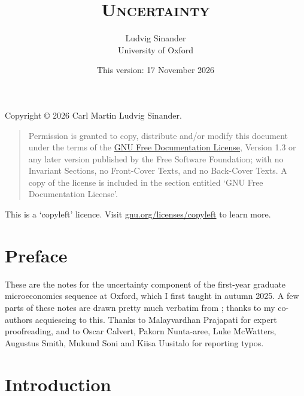 \documentclass[11pt,letterpaper,reqno,oneside]{book}
\title{\scshape Uncertainty}
\author{Ludvig Sinander \\
University of Oxford}
\date{\small This version: 17 November 2026}
\begin{document}
\maketitle

\pagebreak
\hspace{1pt}\vfill
\noindent
Copyright \copyright{} 2026 Carl Martin Ludvig Sinander.

\begin{quotation}
\noindent
Permission is granted to copy, distribute and/or modify this document under the terms of the \href{https://www.gnu.org/licenses/fdl}{GNU Free Documentation License}, Version 1.3 or any later version published by the Free Software Foundation; with no Invariant Sections, no Front-Cover Texts, and no Back-Cover Texts. A copy of the license is included in the section entitled `GNU
Free Documentation License'.
\end{quotation}

\noindent
This is a `copyleft' licence.
Visit \href{https://www.gnu.org/licenses/copyleft}{gnu.org/licenses/copyleft} to learn more.



\chapter*{Preface}
\label{preface}

These are the notes for the uncertainty component of the first-year graduate microeconomics sequence at Oxford, which I first taught in autumn 2025. A few parts of these notes are drawn pretty much verbatim from \textcite{oo}; thanks to my co-authors acquiescing to this. Thanks to Malayvardhan Prajapati for expert proofreading, and to Oscar Calvert, Pakorn Nunta-aree, Luke McWatters, Augustus Smith, Mukund Soni and Kiisa Uusitalo for reporting typos.



\pagebreak
{}
\setcounter{tocdepth}{1}
\tableofcontents
{}



\setcounter{chapter}{-1}
\chapter{Introduction}
\label{ch0}
\end{document}
